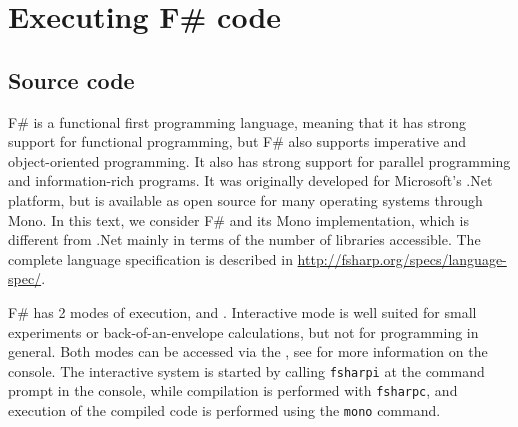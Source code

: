 \chapter{Executing F\# code}

\section{Source code}
F\# is a functional first programming language, meaning that it has strong support for functional programming, but F\# also supports imperative and object-oriented programming. It also has strong support for parallel programming and information-rich programs. It was originally developed for Microsoft's .Net platform, but is available as open source for many operating systems through Mono. In this text, we consider F\# \fsharpVersion and its Mono implementation, which is different from .Net mainly in terms of the number of libraries accessible. The complete language specification is described in \url{http://fsharp.org/specs/language-spec/}. 

F\# has 2 modes of execution,  and . Interactive mode is well suited for small experiments or back-of-an-envelope calculations, but not for programming in general. Both modes can be accessed via the , see  for more information on the console.  The interactive system is started by calling \lstinline[language=console]{fsharpi} at the command prompt in the console, while compilation is performed with \lstinline[language=console]{fsharpc}, and execution of the compiled code is performed using the \lstinline[language=console]{mono} command. 

